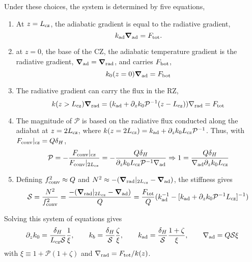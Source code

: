 \documentclass[12pt,preprint]{article}
\newcommand{\gradrad}{\ensuremath{\nabla_{\rm{rad}}}}
\newcommand{\gradad}{\ensuremath{\nabla_{\rm{ad}}}}
\newcommand{\Fconv}{\ensuremath{F_{\rm{conv}}}}
\newcommand{\mP}{\ensuremath{\mathcal{P}}}
\newcommand{\mS}{\ensuremath{\mathcal{S}}}
\renewcommand{\vec}[1]{\boldsymbol{#1}}
\newcommand{\grad}{\vec{\nabla}}
\begin{document}
Under these choices, the system is determined by five equations,
\begin{enumerate}
\item At $z = L_{\rm{cz}}$, the adiabatic gradient is equal to the radiative gradient,
\begin{equation}
k_{\rm{ad}}\grad_{\rm{ad}} = F_{\rm{tot}}.
\end{equation}
\item at $z = 0$, the base of the CZ, the adiabatic temperature gradient is the radiative gradient, $\grad_{\rm{ad}} = \grad_{\rm{rad}}$, and carries $F_{\rm{bot}}$,
\begin{equation}
k_0(z=0) \grad_{\rm{ad}} = F_{\rm{bot}}
\end{equation}
\item The radiative gradient can carry the flux in the RZ,
\begin{equation}
k(z > L_{\rm{cz}}) \grad_{\rm{rad}} = (k_{\rm{ad}} + \partial_z k_0 \mP^{-1}(z - L_{\rm{cz}}))\gradrad = F_{\rm{tot}}
\end{equation}
\item The magnitude of $\mP$ is based on the radiative flux conducted along the adiabat at $z = 2 L_{\rm{cz}}$, where $k(z=2L_{\rm{cz}}) = k_{\rm{ad}} + \partial_z k_0 L_{\rm{cz}}\mP^{-1}$.
Thus, with $\Fconv|_{\rm{cz}} = Q\delta_H$,
\begin{equation}
\mP = -\frac{\Fconv|_{\rm{cz}}}{\Fconv|_{2L_{\rm{cz}}}}
= -\frac{Q\delta_H}{\partial_z k_0 L_{\rm{cz}}\mP^{-1}\gradad}
\Rightarrow
1 = \frac{Q \delta_H}{\gradad \partial_z k_0 L_{\rm{cz}}}
\end{equation}
\item Defining $f_{\rm{conv}}^2 \approx Q$ and $N^2 \approx -(\grad_{\rm{rad}}|_{2L_{\rm{cz}}} - \grad_{\rm{ad}})$, the stiffness gives
\begin{equation}
\mS = \frac{N^2}{f_{\mathrm{conv}}^2} = \frac{-(\grad_{\rm{rad}}|_{2L_{\rm{cz}}} - \grad_{\rm{ad}})}{Q}
= \frac{F_{\mathrm{tot}}}{Q}(k_{\rm{ad}}^{-1} - [k_{\rm{ad}} + \partial_z k_0 \mP^{-1} L_{\rm{cz}}]^{-1})
\end{equation}
\end{enumerate}

Solving this system of equations gives
\begin{align}
\partial_z k_0 = \frac{\delta_H}{L_{\rm{cz}} \mS}\frac{1}{\xi},\qquad
k_b = \frac{\delta_H }{\mS}\frac{\zeta}{\xi},\qquad
k_{\rm{ad}} = \frac{\delta_H}{\mS}\frac{1 + \zeta}{\xi},\qquad
\gradad = Q \mS \xi 
\end{align}
with $\xi \equiv 1 + \mP(1 + \zeta)$ and $\gradrad = F_{\rm{tot}}/k(z)$.
\end{document}
